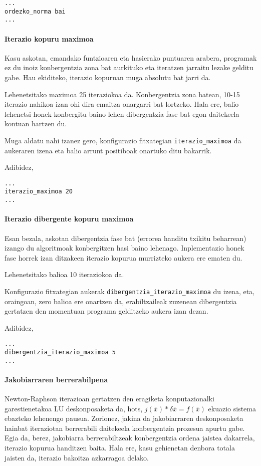 \documentclass[10pt,a4paper,basque]{article}
\begin{document}
\begin{lstlisting}
...
ordezko_norma bai
...
\end{lstlisting}

\paragraph{Iterazio kopuru maximoa}
Kasu askotan, emandako funtzioaren eta hasierako puntuaren arabera, programak ez du inoiz konbergentzia zona bat aurkituko eta iteratzen jarraitu lezake gelditu gabe. Hau ekiditeko, iterazio kopuruan muga absolutu bat jarri da.

Lehenetsitako maximoa 25 iteraziokoa da. Konbergentzia zona batean, 10-15 iterazio nahikoa izan ohi dira emaitza onargarri bat lortzeko. Hala ere, balio lehenetsi honek konbergitu baino lehen dibergentzia fase bat egon daitekeela kontuan hartzen du.

Muga aldatu nahi izanez gero, konfigurazio fitxategian \verb|iterazio_maximoa| da aukeraren izena eta balio arrunt positiboak onartuko ditu bakarrik.

Adibidez,

\begin{lstlisting}
...
iterazio_maximoa 20
...
\end{lstlisting}

\paragraph{Iterazio dibergente kopuru maximoa}
Esan bezala, askotan dibergentzia fase bat (errorea handitu txikitu beharrean) izango du algoritmoak konbergitzen hasi baino lehenago. Inplementazio honek fase horrek izan ditzakeen iterazio kopurua murrizteko aukera ere ematen du.

Lehenetsitako balioa 10 iteraziokoa da.

Konfigurazio fitxategian aukerak \verb|dibergentzia_iterazio_maximoa| du izena, eta, oraingoan, zero balioa ere onartzen da, erabiltzaileak zuzenean dibergentzia gertatzen den momentuan programa gelditzeko aukera izan dezan.

Adibidez,

\begin{lstlisting}
...
dibergentzia_iterazio_maximoa 5
...
\end{lstlisting}

\paragraph{Jakobiarraren berrerabilpena}
Newton-Raphson iterazioan gertatzen den eragiketa konputazionalki garestienetakoa LU deskonposaketa da, hots, $j(\bar{x}) * \delta \bar{x} = f(\bar{x})$ ekuazio sistema ebazteko lehenengo pausua. Zorionez, jakina da jakobiarraren deskonposaketa hainbat iteraziotan berrerabili daitekeela konbergentzia prozesua apurtu gabe. Egia da, berez, jakobiarra berrerabiltzeak konbergentzia ordena jaistea dakarrela, iterazio kopurua handitzen baita. Hala ere, kasu gehienetan denbora totala jaisten da, iterazio bakoitza azkarragoa delako.
\end{document}
